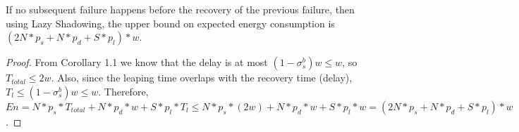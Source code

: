 \begin{theorem}
If no subsequent failure happens before the recovery of the previous failure, then using Lazy Shadowing, the upper bound on expected energy consumption is
$(2N * p_s + N * p_d + S * p_{l})*w$.
\end{theorem}
\begin{proof}
From Corollary 1.1 we know that the delay is at most $(1-\sigma_s^b)w \le w$, so $T_{total} \le 2w$. Also, since the leaping time overlaps with the recovery time (delay), $T_l \le (1-\sigma_s^b)w \le w$. Therefore, $En = N * p_s * T_{total} + N * p_d * w + S * p_{l} * T_l \le N * p_s * (2w) + N * p_d * w + S * p_{l} * w = (2N * p_s + N * p_d + S * p_{l})*w$.
\end{proof}
